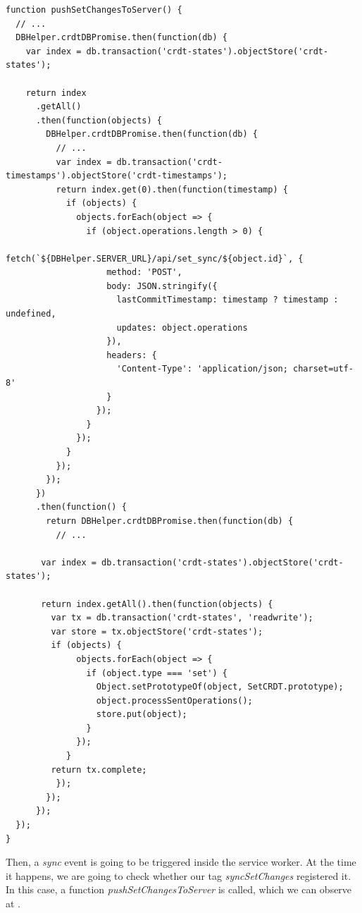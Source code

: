 \begin{lstlisting}[caption={A function \textit{pushSetChangesToServer} triggered every time when a client re-connects to the network.}, label={lst:dev12}]
function pushSetChangesToServer() {
  // ...
  DBHelper.crdtDBPromise.then(function(db) {
    var index = db.transaction('crdt-states').objectStore('crdt-states');

    return index
      .getAll()
      .then(function(objects) {
        DBHelper.crdtDBPromise.then(function(db) {
          // ...
          var index = db.transaction('crdt-timestamps').objectStore('crdt-timestamps');
          return index.get(0).then(function(timestamp) {
            if (objects) {
              objects.forEach(object => {
                if (object.operations.length > 0) {
                  fetch(`${DBHelper.SERVER_URL}/api/set_sync/${object.id}`, {
                    method: 'POST',
                    body: JSON.stringify({
                      lastCommitTimestamp: timestamp ? timestamp : undefined,
                      updates: object.operations
                    }),
                    headers: {
                      'Content-Type': 'application/json; charset=utf-8'
                    }
                  });
                }
              });
            }
          });
        });
      })
      .then(function() {
        return DBHelper.crdtDBPromise.then(function(db) {
          // ...

       var index = db.transaction('crdt-states').objectStore('crdt-states');

       return index.getAll().then(function(objects) {
         var tx = db.transaction('crdt-states', 'readwrite');
         var store = tx.objectStore('crdt-states');
         if (objects) {
              objects.forEach(object => {
                if (object.type === 'set') {
                  Object.setPrototypeOf(object, SetCRDT.prototype);
                  object.processSentOperations();
                  store.put(object);
                }
              });
            }
         return tx.complete;
          });
        });
      });
  });
}
\end{lstlisting}

Then, a \textit{sync} event is going to be triggered inside the service worker. At the time it happens, we are going to check whether our tag \textit{syncSetChanges} registered it. In this case, a function \textit{pushSetChangesToServer} is called, which we can observe at . 

